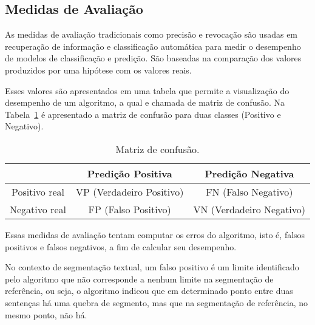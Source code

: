 \subsection{Medidas de Avaliação}

%
As medidas de avaliação tradicionais como precisão e revocação são usadas em recuperação de informação e classificação automática para medir o desempenho de modelos de classificação e predição. São baseadas na comparação dos valores produzidos por uma hipótese com os valores reais. 


%
Esses valores são apresentados em uma tabela que permite a visualização do desempenho de um algoritmo, a qual e chamada de matriz de confusão. Na Tabela~\ref{tab:matrizconfusao} é apresentado a matriz de confusão para duas classes (Positivo e Negativo).


\begin{table}[!h]
	\centering
	
	\begin{tabular}{|c|c|c|}
		\hline
		                & Predição Positiva         & Predição Negativa        \\ \hline
		Positivo real   & VP (Verdadeiro Positivo)  & FN (Falso Negativo)      \\ \hline
		Negativo real   & FP (Falso Positivo)       & VN (Verdadeiro Negativo) \\ \hline
	
	\end{tabular}
	
	\caption{Matriz de confusão.}
	\label{tab:matrizconfusao}

\end{table}


Essas medidas de avaliação tentam computar os erros do algoritmo, isto é, falsos positivos e falsos negativos, a fim de calcular seu desempenho. 

%
No contexto de segmentação textual, um falso positivo é um limite identificado pelo algoritmo que não corresponde a nenhum limite na segmentação de referência, ou seja, o algoritmo indicou que em determinado ponto entre duas sentenças há uma quebra de segmento, mas que na segmentação de referência, no mesmo ponto, não há. 

